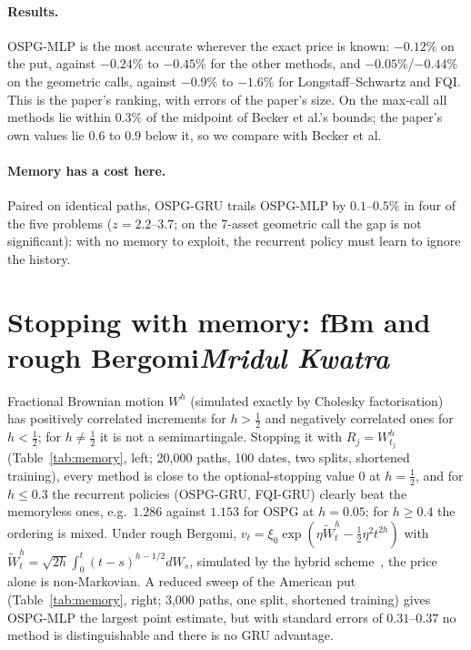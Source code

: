 \documentclass[11pt,a4paper]{article}
\newcommand{\by}[1]{\hfill{\normalfont\normalsize\itshape #1}}
\begin{document}
\paragraph{Results.} OSPG-MLP is the most accurate wherever the exact price is known:
$-0.12\%$ on the put, against $-0.24\%$ to $-0.45\%$ for the other methods, and
$-0.05\%$/$-0.44\%$ on the geometric calls, against $-0.9\%$ to $-1.6\%$ for Longstaff--Schwartz
and FQI. This is the paper's ranking, with errors of the paper's size. On the max-call all methods
lie within $0.3\%$ of the midpoint of Becker et al.'s bounds; the paper's own values lie $0.6$ to
$0.9$ below it, so we compare with Becker et al.

\paragraph{Memory has a cost here.} Paired on identical paths, OSPG-GRU trails OSPG-MLP by
$0.1$--$0.5\%$ in four of the five problems ($z=2.2$--$3.7$; on the 7-asset geometric call the
gap is not significant): with no memory to exploit, the recurrent policy must learn to ignore
the history.

\begin{table}[ht]
\centering\scriptsize
\caption{Out-of-sample option values, mean over three seeds (sd across seeds). Test-set standard
errors: about $0.013$ (put), $0.16$ (max-call), $0.065$ (geometric call).}
\label{tab:replication}

\end{table}

\section[Stopping with memory: fBm and rough Bergomi]{Stopping with memory: fBm and rough Bergomi\by{Mridul Kwatra}}
\label{sec:roughvol}
Fractional Brownian motion $W^h$ (simulated exactly by Cholesky factorisation) has positively
correlated increments for $h>\frac12$ and negatively correlated ones for $h<\frac12$; for
$h\neq\frac12$ it is not a semimartingale. Stopping it with $R_j=W^h_{t_j}$
(Table~\ref{tab:memory}, left; 20{,}000 paths, 100 dates, two splits, shortened training), every
method is close to the optional-stopping value $0$ at $h=\frac12$, and for $h\le0.3$ the recurrent
policies (OSPG-GRU, FQI-GRU) clearly beat the memoryless ones, e.g.\ $1.286$ against $1.153$ for
OSPG at $h=0.05$; for $h\ge0.4$ the ordering is mixed. Under rough Bergomi,
$v_t=\xi_0\exp(\eta\widetilde W^h_t-\tfrac12\eta^2t^{2h})$ with
$\widetilde W^h_t=\sqrt{2h}\int_0^t(t-s)^{h-1/2}dW_s$, simulated by the hybrid
scheme~\cite{blp2017}, the price alone is non-Markovian. A reduced sweep of the American put
(Table~\ref{tab:memory}, right; 3{,}000 paths, one split, shortened training) gives OSPG-MLP the
largest point estimate, but with standard errors of $0.31$--$0.37$ no method is distinguishable
and there is no GRU advantage.
\end{document}
